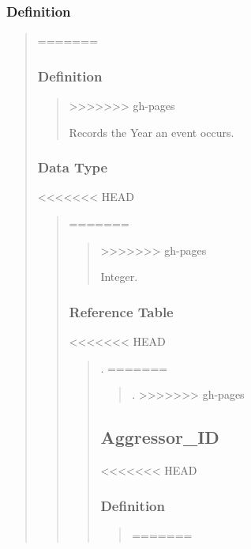 \documentclass[letterpaper,10pt,english]{sphinxmanual}
\begin{document}
\subsubsection{Definition}
\label{\detokenize{database_schema:definition}}\begin{quote}
=======
\label{\detokenize{schema_tables:year}}

\subsubsection{Definition}
\label{\detokenize{schema_tables:definition}}\begin{quote}
>>>>>>> gh-pages

\sphinxAtStartPar
Records the Year an event occurs.
\end{quote}


\subsubsection{Data Type}
<<<<<<< HEAD
\label{\detokenize{database_schema:data-type}}\begin{quote}
=======
\label{\detokenize{schema_tables:data-type}}\begin{quote}
>>>>>>> gh-pages

\sphinxAtStartPar
Integer.
\end{quote}


\subsubsection{Reference Table}
<<<<<<< HEAD
\label{\detokenize{database_schema:reference-table}}\begin{quote}

\sphinxAtStartPar
{\hyperref[\detokenize{database_schema:overview-table}]{}}.
=======
\label{\detokenize{schema_tables:reference-table}}\begin{quote}

\sphinxAtStartPar
{\hyperref[\detokenize{schema_tables:overview-table}]{}}.
>>>>>>> gh-pages
\end{quote}


\subsection{Aggressor\_ID}
<<<<<<< HEAD
\label{\detokenize{database_schema:aggressor-id}}

\subsubsection{Definition}
\label{\detokenize{database_schema:id2}}\begin{quote}
=======
\label{\detokenize{schema_tables:aggressor-id}}


\end{quote}
\end{quote}
\end{quote}
\end{quote}
\end{document}
